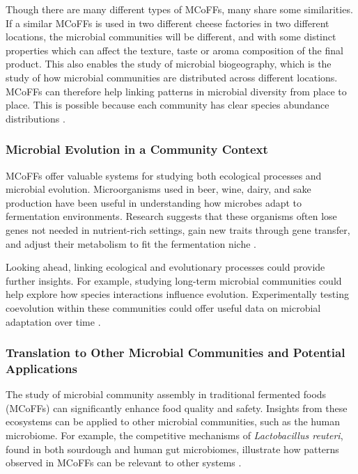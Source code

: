 Though there are many different types of MCoFFs, many share some similarities. If a similar MCoFFs is used in two different cheese factories in two different locations, the microbial communities will be different, and with some distinct properties which can affect the texture, taste or aroma composition of the final product. This also enables the study of microbial biogeography, which is the study of how microbial communities are distributed across different locations. MCoFFs can therefore help linking patterns in microbial diversity from place to place. This is possible because each community has clear species abundance distributions \cite*{L1-FermentedFoods}.

\subsubsection*{Microbial Evolution in a Community Context}

MCoFFs offer valuable systems for studying both ecological processes and microbial evolution. Microorganisms used in beer, wine, dairy, and sake production have been useful in understanding how microbes adapt to fermentation environments. Research suggests that these organisms often lose genes not needed in nutrient-rich settings, gain new traits through gene transfer, and adjust their metabolism to fit the fermentation niche \cite*{L1-FermentedFoods}. 

Looking ahead, linking ecological and evolutionary processes could provide further insights. For example, studying long-term microbial communities could help explore how species interactions influence evolution. Experimentally testing coevolution within these communities could offer useful data on microbial adaptation over time \cite*{L1-FermentedFoods}.

\subsubsection*{Translation to Other Microbial Communities and Potential Applications}
The study of microbial community assembly in traditional fermented foods (MCoFFs) can significantly enhance food quality and safety. Insights from these ecosystems can be applied to other microbial communities, such as the human microbiome. For example, the competitive mechanisms of \textit{Lactobacillus reuteri}, found in both sourdough and human gut microbiomes, illustrate how patterns observed in MCoFFs can be relevant to other systems \cite*{L1-FermentedFoods}.

